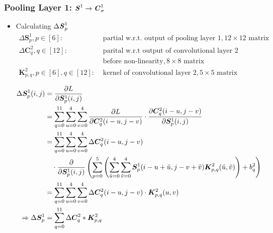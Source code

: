 \documentclass[12pt]{article}
\begin{document}
\subsubsection{Pooling Layer 1: $\textbf{\textit{S}}^1 \rightarrow \textbf{\textit{C}}^1_\sigma$}
\begin{itemize}
\item Calculating $\Delta \textbf{\textit{S}}_p^1$
\begin{align*}
    \Delta\bm{S}^1_p, p \in [6]:& \text{ partial w.r.t. output of pooling layer 1}, 12 \times 12 \text{ matrix}\\
    \Delta \bm{C}_{q}^2, q \in [12]:& \text{ parital w.r.t output of convolutional layer 2} \\& \text{ before non-linearity}, 8 \times 8 \text{ matrix}\\
    \bm{K}^2_{p, q}, p \in [6], q \in [12]:& \text{ kernel of convolutional layer 2}, 5 \times 5 \text{ matrix}\\
\end{align*}
\begin{align*}
    \Delta \bm{S}_p^1(i, j)
    &= \frac{\partial L}{\partial \bm{S}_p^1(i, j)}\\
    &= \sum_{q=0}^{11}\sum_{u=0}^{4}\sum_{v=0}^{4}
    \frac{\partial L}{\partial \bm{C}_q^2(i - u, j - v)}
    \cdot
    \frac{\partial \bm{C}_q^2(i - u, j - v)}{\partial \bm{S}_p^1(i, j)}\\
    &= \sum_{q=0}^{11}\sum_{u=0}^{4}\sum_{v=0}^{4}
    \Delta \bm{C}_q^2(i - u, j - v)\\
    &\quad\cdot
    \frac{\partial}{\partial \bm{S}_p^1(i, j)}
    \left(\sum_{p = 0}^5\left(\sum_{\Tilde{u} = 0}^4\sum_{\Tilde{v} = 0}^4\bm{S}^1_p(i - u +  \Tilde{u}, j - v + \Tilde{v})\bm{K}^2_{p, q}(\Tilde{u}, \Tilde{v})\right) + b^2_q\right)\\
    &= \sum_{q=0}^{11}\sum_{u=0}^{4}\sum_{v=0}^{4}
    \Delta \bm{C}_q^2(i - u, j - v)
    \cdot
    \bm{K}^2_{p, q}(u, v)\\
    \Rightarrow
    \Delta \bm{S}_p^1
    &= \sum_{q=0}^{11}
    \Delta \bm{C}_q^2
    \ast
    \bm{K}^2_{p, q}
\end{align*}
\end{itemize}
\end{document}
